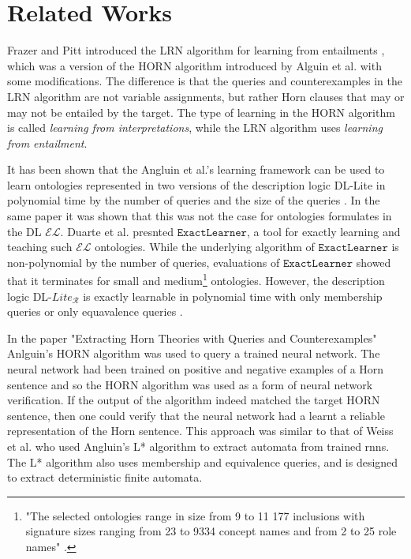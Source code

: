 \chapter{Related Works}

Frazer and Pitt introduced the LRN algorithm for learning from entailments \cite{DBLP:conf/icml/FrazierP93}, which was a version of the HORN algorithm introduced by Alguin et al. \cite{DBLP:journals/ml/AngluinFP92} with some modifications. The difference is that the queries and counterexamples in the LRN algorithm are not variable assignments, but rather Horn clauses that may or may not be entailed by the target. The type of learning in the HORN algorithm is called \emph{learning from interpretations}, while the LRN algorithm uses \emph{learning from entailment}.

It has been shown that the Angluin et al.'s learning framework can be used to learn ontologies represented in two versions of the description logic DL-Lite in polynomial time by the number of queries and the size of the queries \cite{DL_lite}.  In the same paper it was shown that this was not the case for ontologies formulates in the DL $\mathcal{EL}$. Duarte et al. \cite{duarte2018exactlearner} presnted $\texttt{ExactLearner}$, a tool for exactly learning and teaching such $\mathcal{EL}$ ontologies. While the underlying algorithm of $\texttt{ExactLearner}$ is non-polynomial by the number of queries, evaluations of $\texttt{ExactLearner}$ showed that it terminates for small and medium\footnote{"The selected ontologies range in size from 9 to 11 177 inclusions with signature
sizes ranging from 23 to 9334 concept names and from 2 to 25 role names" \cite{duarte2018exactlearner}.} ontologies. However, the description logic DL-$Lite_{\mathcal{R}}$ is exactly learnable in polynomial time with only membership queries or only equavalence queries \cite{Ozaki2020}. 


In the paper "Extracting Horn Theories with Queries and Counterexamples"  Anlguin's HORN algorithm was used to query a trained neural network. The neural network had been trained on positive and negative examples of a Horn sentence and so the HORN algorithm was used as a form of neural network verification. If the output of the algorithm indeed matched the target HORN sentence, then one could verify that the neural network had a learnt a reliable representation of the Horn sentence. This approach was similar to that of Weiss et al. \cite{pmlr-v80-weiss18a, weiss2019learning} who used Angluin’s L* algorithm \cite{ANGLUIN198787} to extract automata from trained \gls{rnn}s. The L* algorithm also uses membership and equivalence queries, and is designed to extract deterministic finite automata. 